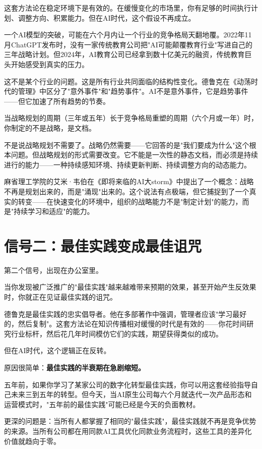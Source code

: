 这套方法论在稳定环境下是有效的。在缓慢变化的市场里，你有足够的时间执行计划、调整方向、积累能力。但在AI时代，这个假设不再成立。

一个AI模型的突破，可能在六个月内让一个行业的竞争格局天翻地覆。2022年11月ChatGPT发布时，没有一家传统教育公司把"AI可能颠覆教育行业"写进自己的三年战略计划。但2024年，AI教育公司已经拿到数十亿美元的融资，传统教育巨头开始感受到真实的压力。

这不是某个行业的问题。这是所有行业共同面临的结构性变化。德鲁克在《动荡时代的管理》中区分了"意外事件"和"趋势事件"。AI不是意外事件，它是趋势事件——但它加速了所有趋势的节奏。

当战略规划的周期（三年或五年）长于竞争格局重塑的周期（六个月或一年）时，你制定的不是战略，是文档。

不是说战略规划不需要了。战略仍然需要——它回答的是"我们要成为什么"这个根本问题。但战略规划的形式需要改变。它不能是一次性的静态文档，而必须是持续进行的能力——一种持续感知环境、持续更新判断、持续调整方向的动态能力。

麻省理工学院的艾米·韦伯在《即将来临的AI大storm》中提出了一个概念：战略不再是规划出来的，而是"涌现"出来的。这个说法有点极端，但它捕捉到了一个真实的转变——在快速变化的环境中，组织的战略能力不是"制定计划"的能力，而是"持续学习和适应"的能力。


\section{信号二：最佳实践变成最佳诅咒}


第二个信号，出现在办公室里。

当你发现被广泛推广的"最佳实践"越来越难带来预期的效果，甚至开始产生反效果时，你就正在见证最佳实践的诅咒。

德鲁克是最佳实践的忠实倡导者。他在多部著作中强调，管理者应该"学习最好的，然后复制"。这套方法论在知识传播相对缓慢的时代是有效的——你花时间研究行业标杆，然后花几年时间模仿它们的实践，期望获得类似的成功。

但在AI时代，这个逻辑正在反转。

原因很简单：\textbf{最佳实践的半衰期在急剧缩短。}

五年前，如果你学习了某家公司的数字化转型最佳实践，你可以用这套经验指导自己未来三到五年的转型。但今天，当AI原生公司每六个月就迭代一次产品形态和运营模式时，"五年前的最佳实践"可能已经是今天的负面教材。

更深的问题是：当所有人都掌握了相同的"最佳实践"，最佳实践就不再是竞争优势的来源。当所有公司都在用同款AI工具优化同款业务流程时，这些工具的差异化价值就趋向于零。

